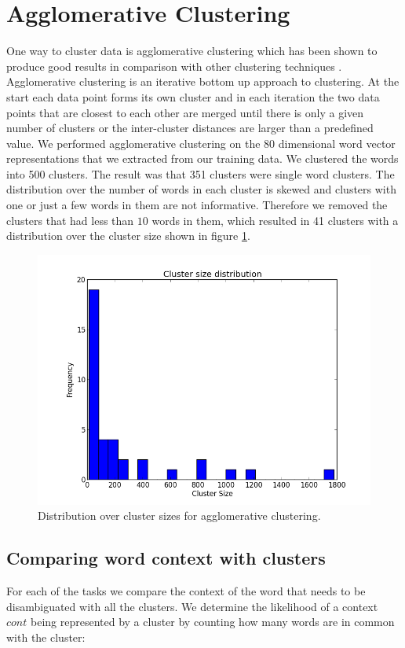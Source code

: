 \documentclass[11pt]{article}
\begin{document}
\section{Agglomerative Clustering}
One way to cluster data is agglomerative clustering which has been shown to produce good results in comparison with other clustering techniques \cite{clustering}. Agglomerative clustering is an iterative bottom up approach to clustering. At the start each data point forms its own cluster and in each iteration the two data points that are closest to each other are merged until there is only a given number of clusters or the inter-cluster distances are larger than a predefined value. We performed agglomerative clustering on the $80$ dimensional word vector representations that we extracted from our training data. We clustered the words into 500 clusters. The result was that 351 clusters were single word clusters. The distribution over the number of words in each cluster is skewed and clusters with one or just a few words in them are not informative. Therefore we removed the clusters that had less than $10$ words in them, which resulted in 41 clusters with a distribution over the cluster size shown in figure \ref{cluster_size}.
\begin{figure}[H]
\center
\includegraphics[scale=0.40]{images/cluster_size.png}
\caption{Distribution over cluster sizes for agglomerative clustering.}
\label{cluster_size}
\end{figure}

\subsection{Comparing word context with clusters}
For each of the tasks we compare the context of the word that needs to be disambiguated with all the clusters. We determine the likelihood of a context $cont$ being represented by a cluster by counting how many words are in common with the cluster:
\end{document}
